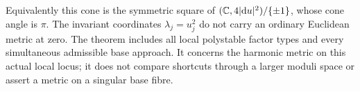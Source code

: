Equivalently this cone is the symmetric square of
$(\mathbb C,4|\mathrm d u|^2)/\{\pm1\}$, whose cone angle is $\pi$.
The invariant coordinates $\lambda_j=u_j^2$ do not
carry an ordinary Euclidean metric at zero.
The theorem includes all local polystable factor types
and every simultaneous admissible base approach. It
concerns the harmonic metric on this actual local locus;
it does not compare shortcuts through a larger moduli
space or assert a metric on a singular base fibre.
